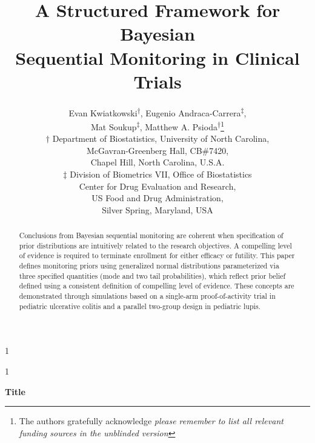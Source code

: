 \documentclass[12pt]{article}
\newcommand{\blind}{1}
\begin{document}
\def\spacingset#1{\renewcommand{\baselinestretch}%
{#1}\small\normalsize} \spacingset{1}



\blind
{
  \title{\bf A Structured Framework for Bayesian \\Sequential Monitoring in Clinical Trials}
  \author{Evan Kwiatkowski\textsuperscript{$\dagger$}, 
	        Eugenio Andraca-Carrera\textsuperscript{$\ddagger$},\\
					Mat Soukup\textsuperscript{$\ddagger$},
					\medskip Matthew A. Psioda\textsuperscript{$\dagger$}\thanks{The authors gratefully acknowledge \textit{please remember to list all relevant funding sources in the unblinded version}}\\
	  $\dagger$ Department of Biostatistics,
		University of North Carolina, \\
		McGavran-Greenberg Hall, CB\#7420, \\
		\medskip Chapel Hill, North Carolina, U.S.A.\\
    $\ddagger$ Division of Biometrics VII, Office of Biostatistics \\
		           Center for Drug Evaluation and Research, \\
							 US Food and Drug Administration, \\
							 Silver Spring, Maryland, USA \\									
		}
  \maketitle
} \fi

\blind
{
  \bigskip
  \bigskip
  \bigskip
  \begin{center}
    {\LARGE\bf Title}
\end{center}
  \medskip
} \fi

\bigskip
\begin{abstract}
Conclusions from Bayesian sequential monitoring are coherent when specification of prior distributions are intuitively related to the research objectives. A compelling level of evidence is required to terminate enrollment for either efficacy or futility. This paper defines monitoring priors using generalized normal distributions parameterized via three specified quantities (mode and two tail probabilities), which reflect prior belief defined using a consistent definition of compelling level of evidence. These concepts are demonstrated through simulations based on a single-arm proof-of-activity trial in pediatric ulcerative colitis and a parallel two-group design in pediatric lupis.
\end{abstract}
\end{document}
